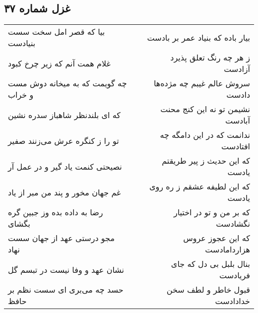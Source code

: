 \begin{center}
\section*{غزل شماره ۳۷}
\label{sec:sh037}
\begin{longtable}{l p{0.5cm} r}
بیا که قصر امل سخت سست بنیادست
&&
بیار باده که بنیاد عمر بر بادست
\\
غلام همت آنم که زیر چرخ کبود
&&
ز هر چه رنگ تعلق پذیرد آزادست
\\
چه گویمت که به میخانه دوش مست و خراب
&&
سروش عالم غیبم چه مژده‌ها دادست
\\
که ای بلندنظر شاهباز سدره نشین
&&
نشیمن تو نه این کنج محنت آبادست
\\
تو را ز کنگره عرش می‌زنند صفیر
&&
ندانمت که در این دامگه چه افتادست
\\
نصیحتی کنمت یاد گیر و در عمل آر
&&
که این حدیث ز پیر طریقتم یادست
\\
غم جهان مخور و پند من مبر از یاد
&&
که این لطیفه عشقم ز ره روی یادست
\\
رضا به داده بده وز جبین گره بگشای
&&
که بر من و تو در اختیار نگشادست
\\
مجو درستی عهد از جهان سست نهاد
&&
که این عجوز عروس هزاردامادست
\\
نشان عهد و وفا نیست در تبسم گل
&&
بنال بلبل بی دل که جای فریادست
\\
حسد چه می‌بری ای سست نظم بر حافظ
&&
قبول خاطر و لطف سخن خدادادست
\\
\end{longtable}
\end{center}
